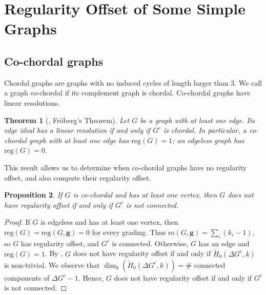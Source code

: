 \documentclass[dvipsnames,10pt]{article}
\newtheorem{theorem}{Theorem}[section]
\newtheorem{proposition}[theorem]{Proposition}
\begin{document}

\section{Regularity Offset of Some Simple Graphs} \label{rossg}

\subsection{Co-chordal graphs}
Chordal graphs are graphs with no induced cycles of length larger than $3$. We call a graph co-chordal if its complement graph is chordal. Co-chordal graphs have linear resolutions.
\begin{theorem}[\cite{RalfFröberg1990}, Fröberg’s Theorem]
    Let $G$ be a graph with at least one edge. Its edge ideal has a linear resolution if and only if $G^c$ is chordal. In particular, a co-chordal graph with at least one edge has $\mathrm{reg}(G)=1$; an edgeless graph has $\mathrm{reg}(G)=0$.
\end{theorem}

This result allows us to determine when co-chordal graphs have no regularity offset, and also compute their regularity offset.

\begin{proposition}
    If $G$ is co-chordal and has at least one vertex, then $G$ does not have regularity offset if and only if $G^c$ is not connected.
\end{proposition}

\begin{proof}
    If $G$ is edgeless and has at least one vertex, then $\mathrm{reg}(G)=\mathrm{reg}(G,\mathbf{g})=0$ for every grading. Thus $\mathrm{ro}(G,\mathbf{g})=\sum_i(k_i-1)$, so $G$ has regularity offset, and $G^c$ is connected. Otherwise, $G$ has an edge and $\mathrm{reg}(G)=1$. By , $G$ does not have regularity offset if and only if $\widetilde{H}_{0}\left(\Delta G^c, k\right)$ is non-trivial. We observe that $\dim_k(\widetilde{H}_{0}\left(\Delta G^c, k\right))=\#$ connected components of  $\Delta G^c-1$. Hence, $G$ does not have regularity offset if and only if $G^c$ is not connected.
\end{proof}
\end{document}
